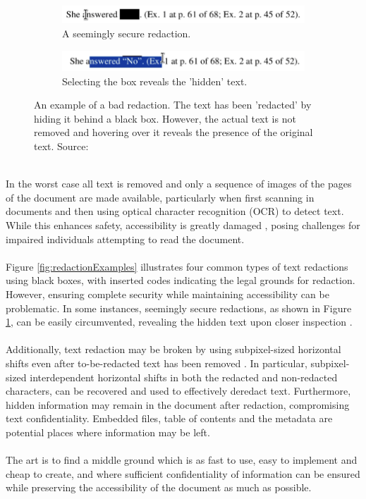\begin{figure}[h]
    
    \begin{subfigure}[h]{0.5\linewidth}
        \includegraphics[width=\linewidth]{latex/media/badredaction2.png}
        \caption{A seemingly secure redaction.}
    \end{subfigure}
    \hfill
        \begin{subfigure}[h]{0.5\linewidth}
        \includegraphics[width=\linewidth]{latex/media/badredaction.png}
    \caption{Selecting the box reveals the 'hidden' text.}
    \end{subfigure}%
    
\caption{An example of a bad redaction. The text has been 'redacted' by hiding it behind a black box. However, the actual text is not removed and hovering over it reveals the presence of the original text. Source: \cite{Xray2021}}
    \label{fig:redaction2}
\end{figure}\\
In the worst case all text is removed and only a sequence of images of the pages of the document are made available, particularly when first scanning in documents and then using optical character recognition (OCR) to detect text. While this enhances safety, accessibility is greatly damaged \cite{maartenMarx}, posing challenges for impaired individuals attempting to read the document.
\\\\
Figure \ref{fig:redactionExamples} illustrates four common types of text redactions using black boxes, with inserted codes indicating the legal grounds for redaction. However, ensuring complete security while maintaining accessibility can be problematic. In some instances, seemingly secure redactions, as shown in Figure \ref{fig:redaction2}, can be easily circumvented, revealing the hidden text upon closer inspection \cite{failures2019}.
\\\\
Additionally, text redaction may be broken by using subpixel-sized horizontal shifts even after to-be-redacted text has been removed \cite{bland2022story}. In particular, subpixel-sized interdependent horizontal shifts in both the redacted and non-redacted characters, can be recovered and used to effectively deredact text. Furthermore, hidden information may remain in the document after redaction, compromising text confidentiality. Embedded files, table of contents and the metadata are potential places where information may be left.
\\\\
The art is to find a middle ground which is as fast to use, easy to implement and cheap to create, and where sufficient confidentiality of information can be ensured while preserving the accessibility of the document as much as possible. 

